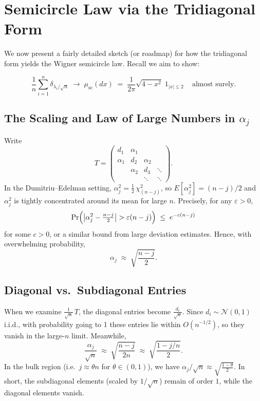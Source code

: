 \documentclass[letterpaper,11pt,oneside,reqno]{article}
\numberwithin{equation}{section}
\theoremstyle{definition}
\begin{document}
\section{Semicircle Law via the Tridiagonal Form}
\label{sec:semicircle-tridiag}

We now present a fairly detailed sketch (or roadmap) for how the tridiagonal form yields the Wigner semicircle law. Recall we aim to show:

\[
  \frac{1}{n}\sum_{i=1}^n \delta_{\lambda_i/\sqrt{n}}
  \;\longrightarrow\;
  \mu_{\mathrm{sc}}(dx)\;=\;\frac{1}{2\pi}\sqrt{4 - x^2}\; 1_{|x|\le2}\,
  \quad\text{almost surely}.
\]

\subsection{The Scaling and Law of Large Numbers in \(\alpha_j\)}

Write
\[
  T = \begin{pmatrix}
    d_1 & \alpha_1 & & \\
    \alpha_1 & d_2 & \alpha_2 & \\
    & \alpha_2 & d_3 & \ddots \\
    & & \ddots & \ddots
  \end{pmatrix}.
\]
In the Dumitriu--Edelman setting, $\alpha_j^2 = \frac{1}{2}\,\chi^2_{(n-j)}$, so $ E[\alpha_j^2]=(n-j)/2$ and $\alpha_j^2$ is tightly concentrated around its mean for large $n$. Precisely, for any $\varepsilon>0$,
\[
  \Pr\Bigl(\bigl|\alpha_j^2 - \tfrac{n-j}{2}\bigr| > \varepsilon (n-j)\Bigr)
  \;\le\; e^{-c(n-j)}
\]
for some $c>0$, or a similar bound from large deviation estimates. Hence, with overwhelming probability,
\[
  \alpha_j \;\approx\; \sqrt{\frac{n-j}{2}}.
\]

\subsection{Diagonal vs.\ Subdiagonal Entries}

When we examine $\frac{1}{\sqrt{n}}\,T$, the diagonal entries become $\frac{d_i}{\sqrt{n}}$. Since $d_i \sim \mathcal{N}(0,1)$ i.i.d., with probability going to 1 these entries lie within $O(n^{-1/2})$, so they vanish in the large-$n$ limit. Meanwhile,
\[
  \frac{\alpha_j}{\sqrt{n}}
  \;\approx\;
  \sqrt{\frac{n-j}{2n}}
  \;\approx\;
  \sqrt{\frac{1 - j/n}{2}}.
\]
In the bulk region (i.e.\ $j\approx \theta n$ for $\theta\in (0,1)$), we have $\alpha_j/\sqrt{n} \approx \sqrt{\frac{1-\theta}{2}}$. In short, the subdiagonal elements (scaled by $1/\sqrt{n}$) remain of order $1$, while the diagonal elements vanish.
\end{document}
